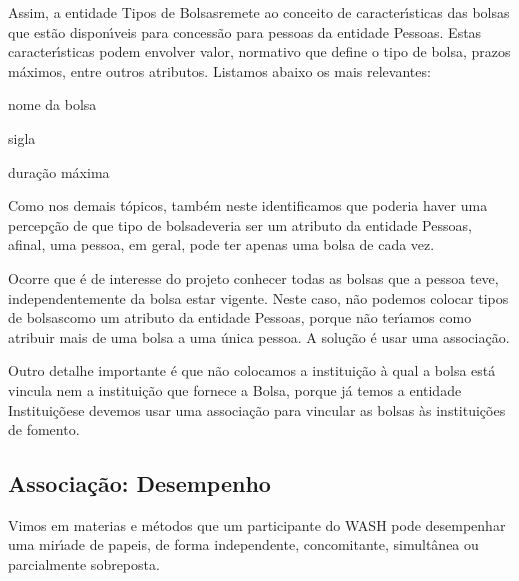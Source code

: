 \documentclass[
12pt,		%
openright,	%
twoside,  %
a4paper,			%
chapter=TITLE,		%
english,			%
french,				%
spanish,			%
brazil				%
]{USPSC-classe/USPSC}
\begin{document}
\noindent\begin{center}\mbox{\centering{}}\end{center}


Assim, a entidade \textquotedbl Tipos de Bolsas\textquotedbl  remete ao conceito de caracter\'{\i}sticas das bolsas que est\~ao dispon\'{\i}veis para concess\~ao para pessoas da entidade \textquotedbl Pessoas\textquotedbl . Estas caracter\'{\i}sticas podem envolver valor, normativo que define o tipo de bolsa, prazos m\'aximos, entre outros atributos. Listamos abaixo os mais relevantes:



\begin{alineas}
\item nome da bolsa
\item sigla
\item dura\c{c}\~ao m\'axima
\end{alineas}

Como nos demais t\'opicos, tamb\'em neste identificamos que poderia haver uma percep\c{c}\~ao de que \textquotedbl tipo de bolsa\textquotedbl  deveria ser um atributo da entidade \textquotedbl Pessoas\textquotedbl , afinal, uma pessoa, em geral, pode ter apenas uma bolsa de cada vez.


Ocorre que \'e de interesse do projeto conhecer todas as bolsas que a pessoa teve, independentemente da bolsa estar vigente. Neste caso, n\~ao podemos colocar \textquotedbl tipos de bolsas\textquotedbl  como um atributo da entidade \textquotedbl Pessoas\textquotedbl , porque n\~ao ter\'{\i}amos como atribuir mais de uma bolsa a uma \'unica pessoa. A solu\c{c}\~ao \'e usar uma associa\c{c}\~ao.


Outro detalhe importante \'e que n\~ao colocamos a institui\c{c}\~ao \`a qual a bolsa est\'a vincula nem a institui\c{c}\~ao que fornece a Bolsa, porque j\'a temos a entidade \textquotedbl Institui\c{c}\~oes\textquotedbl  e devemos usar uma associa\c{c}\~ao para vincular as bolsas \`as institui\c{c}\~oes de fomento.


\subsection[Associa\c{c}\~ao: Desempenho]{Associa\c{c}\~ao: Desempenho}\label{Associa\c{c}\~ao: Desempenho}
Vimos em materias e m\'etodos que um participante do WASH pode desempenhar uma mir\'{\i}ade de papeis, de forma independente, concomitante, simult\^anea ou parcialmente sobreposta.
\end{document}
